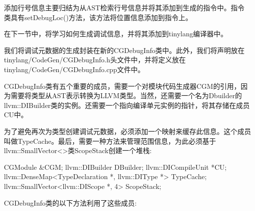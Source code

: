 添加行号信息主要归结为从AST检索行号信息并将其添加到生成的指令中。指令类具有setDebugLoc()方法，该方法将位置信息添加到指令上。

在下一节中，将学习如何生成调试信息，并将其添加到tinylang编译器中。


我们将调试元数据的生成封装在新的CGDebugInfo类中。此外，我们将声明放在tinylang/CodeGen/CGDebugInfo.h头文件中，并将定义放在tinylang/CodeGen/CGDebugInfo.cpp文件中。

CGDebugInfo类有五个重要的成员，需要一个对模块代码生成器CGM的引用，因为需要将类型从AST表示转换为LLVM类型。当然，还需要一个名为Dbuilder的llvm::DIBuilder类的实例。还需要一个指向编译单元实例的指针，将其存储在成员CU中。

为了避免再次为类型创建调试元数据，必须添加一个映射来缓存此信息。这个成员叫做TypeCache。最后，需要一种方法来管理范围信息，为此必须基于llvm::SmallVector<>类ScopeStack创建一个堆栈:

\begin{cpp}
CGModule &CGM;
llvm::DIBuilder DBuilder;
llvm::DICompileUnit *CU;
llvm::DenseMap<TypeDeclaration *, llvm::DIType *>
    TypeCache;
llvm::SmallVector<llvm::DIScope *, 4> ScopeStack;
\end{cpp}

CGDebugInfo类的以下方法利用了这些成员:

